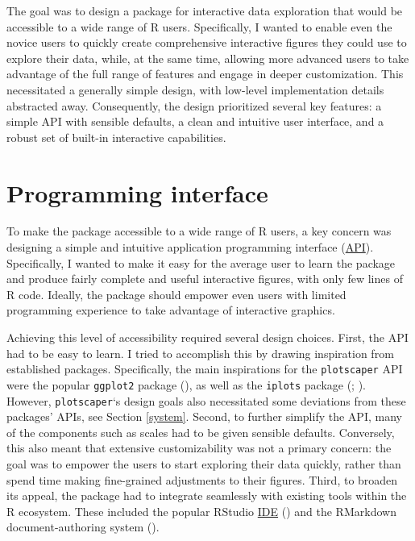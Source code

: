 \documentclass[
]{book}
\theoremstyle{definition}
\theoremstyle{definition}
\theoremstyle{definition}
\theoremstyle{definition}
\theoremstyle{remark}
\begin{document}
The goal was to design a package for interactive data exploration that would be accessible to a wide range of R users. Specifically, I wanted to enable even the novice users to quickly create comprehensive interactive figures they could use to explore their data, while, at the same time, allowing more advanced users to take advantage of the full range of features and engage in deeper customization. This necessitated a generally simple design, with low-level implementation details abstracted away. Consequently, the design prioritized several key features: a simple API with sensible defaults, a clean and intuitive user interface, and a robust set of built-in interactive capabilities.

\section{Programming interface}\label{programming-interface}

To make the package accessible to a wide range of R users, a key concern was designing a simple and intuitive application programming interface (\hyperref[API]{API}). Specifically, I wanted to make it easy for the average user to learn the package and produce fairly complete and useful interactive figures, with only few lines of R code. Ideally, the package should empower even users with limited programming experience to take advantage of interactive graphics.

Achieving this level of accessibility required several design choices. First, the API had to be easy to learn. I tried to accomplish this by drawing inspiration from established packages. Specifically, the main inspirations for the \texttt{plotscaper} API were the popular \texttt{ggplot2} package (), as well as the \texttt{iplots} package (; ). However, \texttt{plotscaper}`s design goals also necessitated some deviations from these packages' APIs, see Section \ref{system}. Second, to further simplify the API, many of the components such as scales had to be given sensible defaults. Conversely, this also meant that extensive customizability was not a primary concern: the goal was to empower the users to start exploring their data quickly, rather than spend time making fine-grained adjustments to their figures. Third, to broaden its appeal, the package had to integrate seamlessly with existing tools within the R ecosystem. These included the popular RStudio \hyperref[ide]{IDE} () and the RMarkdown document-authoring system ().
\end{document}
